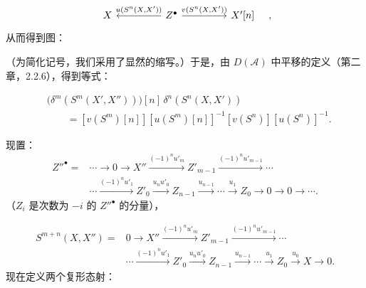 \clearpage
{}%
\begingroup\small\setlength{\parskip}{0pt}\setlength{\emergencystretch}{1.5em}
\setlength{\abovedisplayskip}{4pt plus 2pt minus 2pt}%
\setlength{\belowdisplayskip}{4pt plus 2pt minus 2pt}%

\[
\begin{tikzcd}[column sep=4.5em]
X & Z^\bullet
  \arrow[l,"{u(S^n(X,X'))}"']
  \arrow[r,"{v(S^n(X,X'))}"]
& X'[n]
\end{tikzcd}
\quad,
\]
从而得到图：

\begin{center}
\end{center}
（为简化记号，我们采用了显然的缩写。）于是，由
$D(\mathcal A)$ 中平移的定义（第二章，2.2.6），得到等式：

\begin{equation}
\begin{aligned}
&\bigl(\delta^m(S^m(X',X''))\bigr)[n]\,
  \delta^n(S^n(X,X'))\\
&\qquad={}
[v(S^m)[n]][u(S^m)[n]]^{-1}[v(S^n)][u(S^n)]^{-1}.
\end{aligned}
\tag{3.2.5.1}
\end{equation}

现置：
\begin{equation}
\begin{aligned}
Z''^\bullet={}&\cdots\longrightarrow0\longrightarrow X''
\xrightarrow{(-1)^n u'_m}Z'_{m-1}
\xrightarrow{(-1)^n u'_{m-1}}\cdots\\
&\cdots\xrightarrow{(-1)^n u'_1}Z'_0
\xrightarrow{u_nu'_0}Z_{n-1}
\xrightarrow{u_{n-1}}\cdots\xrightarrow{u_1}Z_0
\longrightarrow0\longrightarrow0\longrightarrow\cdots.
\end{aligned}
\tag{3.2.5.2}
\end{equation}
（$Z_i$ 是次数为 $-i$ 的 $Z''^\bullet$ 的分量），

\[
\begin{aligned}
S^{m+n}(X,X'')={}&0\longrightarrow X''
\xrightarrow{(-1)^n u'_m}Z'_{m-1}
\xrightarrow{(-1)^n u'_{m-1}}\cdots\\
&\cdots\xrightarrow{(-1)^n u'_1}Z'_0
\xrightarrow{u_nu'_0}Z_{n-1}
\xrightarrow{u_{n-1}}\cdots\xrightarrow{u_1}Z_0
\xrightarrow{u_0}X\longrightarrow0.
\end{aligned}
\]
现在定义两个复形态射：

